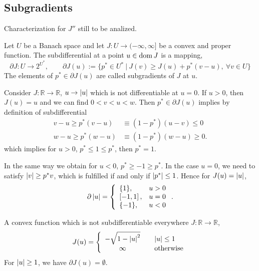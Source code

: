 \subsection{Subgradients}
Characterization for $J''$ still to be analized.
\begin{definition}
	Let $U$ be a Banach space and let $J:U\rightarrow (-\infty, \infty]$ be a convex and proper function.
	The subdifferential at a point $u \in \mathrm{dom\,} J$ is a mapping,
	\[
		\partial J : U \rightarrow 2^{U^*}, \qquad \partial J(u):=\lbrace p^* \in U^* \ | \ J(v)\geq J(u)+p^*(v-u),
		\ \forall v \in U\rbrace
	\]
	The elements of $p^* \in \partial J(u)$ are called subgradients of $J$ at $u$.
\end{definition}
\begin{example}
	Consider $J:\mathbb{R}\rightarrow \mathbb{R}$, $u\rightarrow \left|u\right|$ which is not differentiable at $u=0$. If $u>0$, then $J(u)=u$ and we can find $0<v<u<w$. Then $p^* \in \partial J(u)$ implies by definition of subdifferential
	\begin{align*}
		v-u \geq p^*(v-u) &\equiv (1-p^*)(u-v) \leq 0 \\
		w-u \geq p^*(w-u) &\equiv (1-p^*)(w-u) \geq 0.
	\end{align*}
	which implies for $u>0$, $p^* \leq 1 \leq p^*$, then $p^*=1$.
	
	In the same way we obtain for $u<0$, $p^*\geq -1 \geq p^*$. 
	In the case $u=0$, we need to satisfy $\left|v\right|\geq p^*v$, which is fulfilled if and only if $\left|p^*\right|\leq 1$. Hence for $J(u)=\left|u\right|$,
	\begin{equation*}
	\partial \left|u\right|=
	\left\lbrace
		\begin{array}{lr}
		\{1\}, & u>0 \\
		\left[-1,1\right], & u=0 \\
		\{-1\}, & u < 0
		\end{array}
	\right. .
	\end{equation*}
\end{example}

\begin{example}
	A convex function which is not subdifferentiable everywhere $J:\mathbb{R} \rightarrow \mathbb{R}$, 
	\begin{equation*}
		J(u)=\left\lbrace\begin{array}{cl}
		 -\sqrt{1-\left|u\right|^2} &\quad \left|u\right|\leq 1 \\
		 \infty &\quad \text{otherwise}
		\end{array}
	\right.
	\end{equation*}
	For $\left|u\right|\geq 1$, we have $\partial J(u) = \emptyset$.
\end{example}


